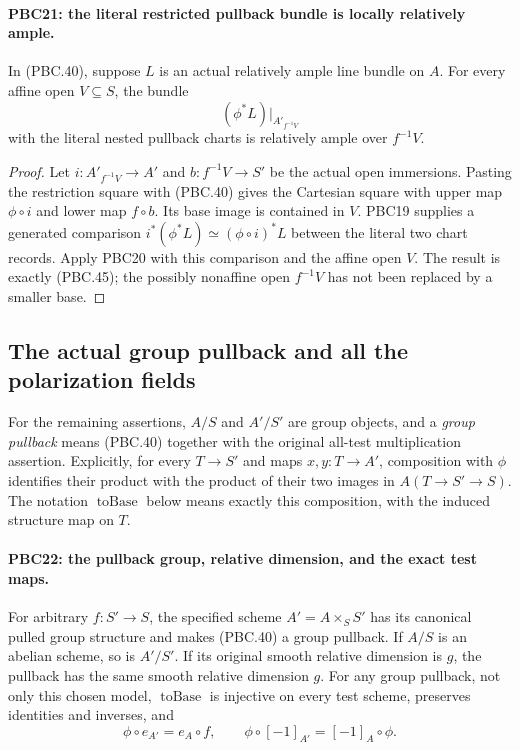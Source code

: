 \paragraph{PBC21: the literal restricted pullback bundle is locally relatively ample.}
\label{claim:PBC21}
In (PBC.40), suppose $L$ is an actual relatively ample
line bundle on $A$.  For every affine open $V\subseteq S$,
the bundle
\[
 (\phi^*L)|_{A'_{f^{-1}V}}
                                                        \tag{PBC.45}
\]
with the literal nested pullback charts is relatively ample
over $f^{-1}V$.

\begin{proof}
Let $i:A'_{f^{-1}V}\to A'$ and
$b:f^{-1}V\to S'$ be the actual open immersions.
Pasting the restriction square with (PBC.40) gives the
Cartesian square with upper map $\phi\circ i$ and lower
map $f\circ b$.  Its base image is contained in $V$.
PBC19 supplies a generated comparison
$i^*(\phi^*L)\simeq(\phi\circ i)^*L$ between the literal
two chart records.  Apply PBC20 with this comparison and
the affine open $V$.
The result is exactly (PBC.45); the possibly nonaffine
open $f^{-1}V$ has not been replaced by a smaller base.
\end{proof}

\subsection{The actual group pullback and all the polarization fields}

For the remaining assertions, $A/S$ and $A'/S'$ are group
objects, and a \emph{group pullback} means (PBC.40) together
with the original all-test multiplication assertion.
Explicitly, for every $T\to S'$ and maps $x,y:T\to A'$,
composition with $\phi$ identifies their product with the
product of their two images in $A(T\to S'\to S)$.
The notation $\operatorname{toBase}$ below means exactly
this composition, with the induced structure map on $T$.

\paragraph{PBC22: the pullback group, relative dimension, and the exact test maps.}
\label{claim:PBC22}
For arbitrary $f:S'\to S$, the specified scheme
$A'=A\times_S S'$ has its canonical pulled group structure
and makes (PBC.40) a group pullback.  If $A/S$ is an
abelian scheme, so is $A'/S'$.  If its original smooth
relative dimension is $g$, the pullback has the same
smooth relative dimension $g$.
For any group pullback, not only this chosen model,
$\operatorname{toBase}$ is injective on every test scheme,
preserves identities and inverses, and
\[
 \phi\circ e_{A'}=e_A\circ f,\qquad
 \phi\circ[-1]_{A'}=[-1]_A\circ\phi .
                                                        \tag{PBC.46}
\]

